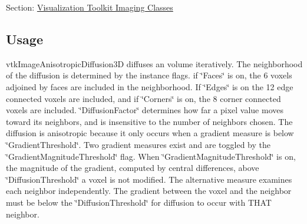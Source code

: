 Section\-: \hyperlink{sec_vtkimaging}{Visualization Toolkit Imaging Classes} \hypertarget{vtkwidgets_vtkxyplotwidget_Usage}{}\subsection{Usage}\label{vtkwidgets_vtkxyplotwidget_Usage}
vtk\-Image\-Anisotropic\-Diffusion3\-D diffuses an volume iteratively. The neighborhood of the diffusion is determined by the instance flags. if \char`\"{}\-Faces\char`\"{} is on, the 6 voxels adjoined by faces are included in the neighborhood. If \char`\"{}\-Edges\char`\"{} is on the 12 edge connected voxels are included, and if \char`\"{}\-Corners\char`\"{} is on, the 8 corner connected voxels are included. \char`\"{}\-Diffusion\-Factor\char`\"{} determines how far a pixel value moves toward its neighbors, and is insensitive to the number of neighbors chosen. The diffusion is anisotropic because it only occurs when a gradient measure is below \char`\"{}\-Gradient\-Threshold\char`\"{}. Two gradient measures exist and are toggled by the \char`\"{}\-Gradient\-Magnitude\-Threshold\char`\"{} flag. When \char`\"{}\-Gradient\-Magnitude\-Threshold\char`\"{} is on, the magnitude of the gradient, computed by central differences, above \char`\"{}\-Diffusion\-Threshold\char`\"{} a voxel is not modified. The alternative measure examines each neighbor independently. The gradient between the voxel and the neighbor must be below the \char`\"{}\-Diffusion\-Threshold\char`\"{} for diffusion to occur with T\-H\-A\-T neighbor.

